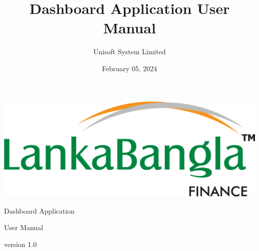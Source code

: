 \documentclass{article}
\begin{document}
\begin{titlepage}
    \centering
    \vspace*{2cm}
    \includegraphics[width=1.0\textwidth]{image/logo_lbfl.png}
    \vspace*{2cm}

    {\Huge Dashboard Application}\\
    
    \vspace*{1cm}
    
    {\LARGE User Manual}
    
    \vspace*{0.5cm}
    
    {\Large version 1.0}
\end{titlepage}

\title{Dashboard Application User Manual}
\author{Unisoft System Limited}
\date{February 05, 2024}


\maketitle



\newpage

\tableofcontents

\newpage


\end{document}
